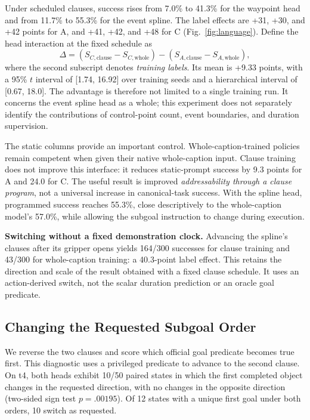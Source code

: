 Under scheduled clauses, success rises from 7.0\% to 41.3\% for the waypoint head and from 11.7\% to 55.3\% for the event spline. The label effects are +31, +30, and +42 points for A, and +41, +42, and +48 for C (Fig.~\ref{fig:language}). Define the head interaction at the fixed schedule as
\begin{equation}
 \Delta=(S_{C,\mathrm{clause}}-S_{C,\mathrm{whole}})
        -(S_{A,\mathrm{clause}}-S_{A,\mathrm{whole}}),
 \label{eq:interaction}
\end{equation}
where the second subscript denotes \emph{training labels}. Its mean is +9.33 points, with a 95\% $t$ interval of [1.74, 16.92] over training seeds and a hierarchical interval of [0.67, 18.0]. The advantage is therefore not limited to a single training run. It concerns the event spline head as a whole; this experiment does not separately identify the contributions of control-point count, event boundaries, and duration supervision.

The static columns provide an important control. Whole-caption-trained policies remain competent when given their native whole-caption input. Clause training does not improve this interface: it reduces static-prompt success by 9.3 points for A and 24.0 for C. The useful result is improved \emph{addressability through a clause program}, not a universal increase in canonical-task success. With the spline head, programmed success reaches 55.3\%, close descriptively to the whole-caption model's 57.0\%, while allowing the subgoal instruction to change during execution.

\textbf{Switching without a fixed demonstration clock.} Advancing the spline's clauses after its gripper opens yields 164/300 successes for clause training and 43/300 for whole-caption training: a 40.3-point label effect. This retains the direction and scale of the result obtained with a fixed clause schedule. It uses an action-derived switch, not the scalar duration prediction or an oracle goal predicate.

\subsection{Changing the Requested Subgoal Order}

We reverse the two clauses and score which official goal predicate becomes true first. This diagnostic uses a privileged predicate to advance to the second clause. On t4, both heads exhibit 10/50 paired states in which the first completed object changes in the requested direction, with no changes in the opposite direction (two-sided sign test $p=.00195$). Of 12 states with a unique first goal under both orders, 10 switch as requested.

